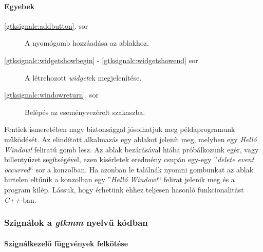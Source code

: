 \paragraph{Egyebek}

\begin{description}
 \item[\ref{gtksignalc:addbutton}. sor] A nyomógomb hozzáadása az ablakhoz.

 \item[\ref{gtksignalc:widgetshowbegin} - \ref{gtksignalc:widgetshowend} sor] A létrehozott \textit{widget}ek megjelenítése.

 \item[\ref{gtksignalc:windowreturn}. sor] Belépés az eseményvezérelt szakaszba.
\end{description}

Fentiek ismeretében nagy biztonsággal jósolhatjuk meg példaprogramunk működését. Az elindított alkalmazás egy ablakot jelenít meg, melyben egy \textit{Helló Window!} feliratú gomb lesz. Az ablak bezárásával hiába próbálkozunk egér, vagy billentyűzet segítségével, ezen kísérletek eredmény csupán egy-egy ''\textit{delete event occurred}`` sor a konzolban. Ha azonban le találnák nyomni gombunkat az ablak hirtelen eltűnik a konzolban egy ''\textit{Helló Window!}`` felirat jelenik meg és a program kilép. Lássuk, hogy érhetünk ehhez teljesen hasonló funkcionalitást \textit{C++}-ban.

\subsubsection{Szignálok a \textit{gtkmm} nyelvű kódban}

\paragraph{Szignálkezelő függvények felkötése}

